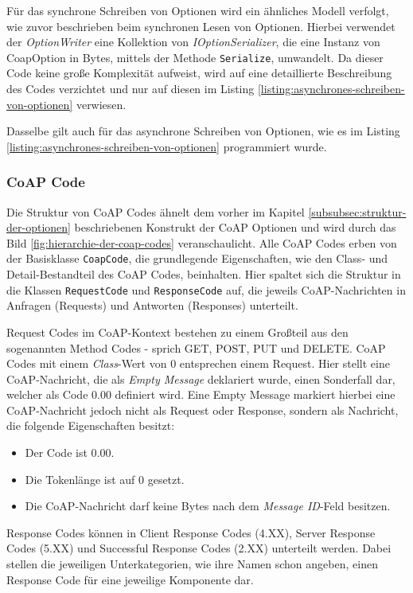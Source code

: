 Für das synchrone Schreiben von Optionen wird ein ähnliches Modell verfolgt, wie zuvor beschrieben beim synchronen Lesen von Optionen. Hierbei verwendet der \textit{OptionWriter} eine Kollektion von \textit{IOptionSerializer}, die eine Instanz von CoapOption in Bytes, mittels der Methode \texttt{Serialize}, umwandelt. Da dieser Code keine große Komplexität aufweist, wird auf eine detaillierte Beschreibung des Codes verzichtet und nur auf diesen im Listing \ref{listing:asynchrones-schreiben-von-optionen} verwiesen.

Dasselbe gilt auch für das asynchrone Schreiben von Optionen, wie es im Listing \ref{listing:asynchrones-schreiben-von-optionen} programmiert wurde.

\subsubsection{CoAP Code}
\label{subsubsec:coap-code}

Die Struktur von CoAP Codes ähnelt dem vorher im Kapitel \ref{subsubsec:struktur-der-optionen} beschriebenen Konstrukt der CoAP Optionen und wird durch das Bild \ref{fig:hierarchie-der-coap-codes} veranschaulicht. Alle CoAP Codes erben von der Basisklasse \texttt{CoapCode}, die grundlegende Eigenschaften, wie den Class- und Detail-Bestandteil des CoAP Codes, beinhalten. Hier spaltet sich die Struktur in die Klassen \texttt{RequestCode} und \texttt{ResponseCode} auf, die jeweils CoAP-Nachrichten in Anfragen (Requests) und Antworten (Responses) unterteilt.

Request Codes im CoAP-Kontext bestehen zu einem Großteil aus den sogenannten Method Codes - sprich GET, POST, PUT und DELETE. CoAP Codes mit einem \textit{Class}-Wert von 0 entsprechen einem Request. Hier stellt eine CoAP-Nachricht, die als \textit{Empty Message} deklariert wurde, einen Sonderfall dar, welcher als Code 0.00 definiert wird. Eine Empty Message markiert hierbei eine CoAP-Nachricht jedoch nicht als Request oder Response, sondern als Nachricht, die folgende Eigenschaften besitzt:
\begin{itemize}
    \item Der Code ist 0.00.
    \item Die Tokenlänge ist auf 0 gesetzt.
    \item Die CoAP-Nachricht darf keine Bytes nach dem \textit{Message ID}-Feld besitzen. 
\end{itemize}

Response Codes können in Client Response Codes (4.XX), Server Response Codes (5.XX) und Successful Response Codes (2.XX) unterteilt werden. Dabei stellen die jeweiligen Unterkategorien, wie ihre Namen schon angeben, einen Response Code für eine jeweilige Komponente dar.

